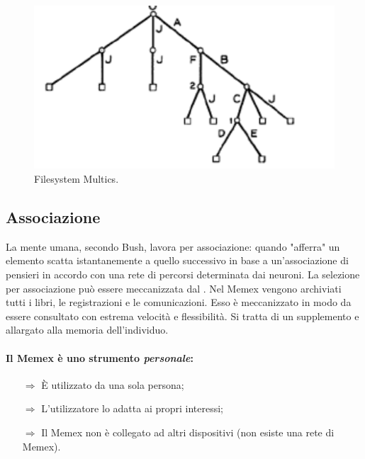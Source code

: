 \begin{figure}[h]
    \centering
    \includegraphics[scale=0.25]{images/Unix.png}
    \caption{Filesystem Multics.}
\end{figure}


\subsection{Associazione}

La mente umana, secondo Bush, lavora per associazione: quando 
"afferra" un elemento scatta istantanemente a quello successivo in base 
a un'associazione di pensieri in accordo con una rete di percorsi determinata dai neuroni.
La selezione per associazione può essere meccanizzata dal .
Nel Memex vengono archiviati tutti i libri, le registrazioni e le comunicazioni.
Esso è meccanizzato in modo da essere consultato con estrema velocità e flessibilità.
Si tratta di un supplemento  e allargato alla memoria dell'individuo.

\paragraph{Il Memex è uno strumento \textit{personale}:}

\begin{itemize}
    \item [$\Rightarrow$] È utilizzato da una sola persona;
    \item [$\Rightarrow$] L'utilizzatore lo adatta ai propri interessi;
    \item [$\Rightarrow$] Il Memex non è collegato ad altri dispositivi (non esiste una rete di Memex).
\end{itemize}


